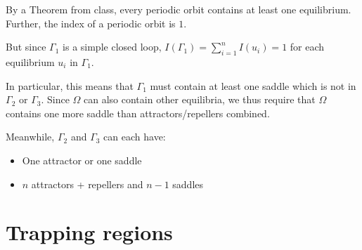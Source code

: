 \documentclass[12pt]{article}
\begin{document}
\color{blue}
By a Theorem from class, every periodic orbit contains at least one equilibrium. Further, the index of a periodic orbit is $1$.

But since $\Gamma_1$ is a simple closed loop, $I(\Gamma_1) = \sum_{i=1}^n I(u_i) = 1$ for each equilibrium $u_i$ in $\Gamma_1$.

In particular, this means that $\Gamma_1$ must contain at least one saddle which is not in $\Gamma_2$ or $\Gamma_3$. Since $\Omega$ can also contain other equilibria, we thus require that $\Omega$ contains one more saddle than attractors/repellers combined.

Meanwhile, $\Gamma_2$ and $\Gamma_3$ can each have:
\begin{itemize}
    \item One attractor or one saddle
    \item $n$ attractors + repellers and $n - 1$ saddles
\end{itemize}
\color{black}

\pagebreak



\section{Trapping regions}
\end{document}
